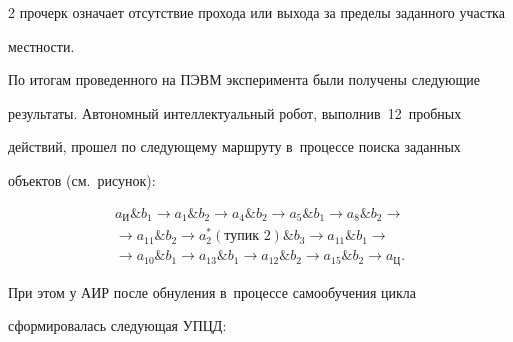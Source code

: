 \begin{multicols}{2}
прочерк означает отсутствие прохода или выхода за пределы заданного участка 


мест\-ности. 


  


  По итогам проведенного на ПЭВМ эксперимента были получены сле\-ду\-ющие 


результаты. Автономный интеллектуальный робот, выполнив~12~пробных 


действий, прошел по сле\-ду\-юще\-му марш\-ру\-ту в~процессе поиска заданных 


объектов (см.\ рисунок):





\vspace*{-2pt}





\noindent


  \begin{multline*}


  a_{\mathrm{И}} \& b_1 \to a_1\& b_2 \to a_4 \& b_2\to a_5 \& b_1\to a_8 \&


  b_2\to{}\\


  {}\to  a_{11} \& b_2\to a_2^*(\mbox{тупик~2}) \& b_3\to a_{11} \& b_1\to{}\\


  {}\to  a_{10} \& b_1\to a_{13} \& b_1\to a_{12} \& b_2\to 


a_{15} \& b_2\to a_{\mathrm{Ц}}.


  \end{multline*}




  


  \vspace*{-2pt}


  


  \noindent


  При этом у АИР после обнуления в~процессе са\-мо\-обуче\-ния цик\-ла 


сформировалась сле\-ду\-ющая \mbox{УПЦД}:





\vspace*{-2pt}





\noindent



\end{multicols}
